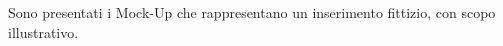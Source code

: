 \documentclass{natourDoc}
\begin{document}
Sono presentati i Mock-Up che rappresentano un inserimento fittizio, con scopo illustrativo.

\begin{figure}[htbp]
	\centering
	\begin{minipage}[t]{0.4\textwidth}

\end{minipage}
\end{figure}
\end{document}
